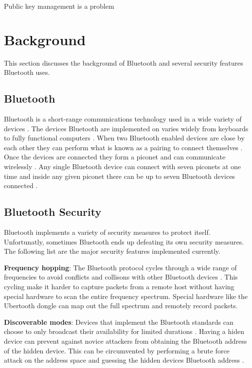 \documentclass{acm_proc_article-sp}
\begin{document}
Public key management is a problem \cite{almonanimitmssp}

\section{Background}
This section discusses the background of Bluetooth and several security features Bluetooth uses.

\subsection{Bluetooth}
Bluetooth is a short-range communications technology used in a wide variety of devices \cite{bluetooth}. The devices Bluetooth are implemented on varies widely from keyboards to fully functional computers \cite{bluetooth}. When two Bluetooth enabled devices are close by each other they can perform what is known as a pairing to connect themselves \cite{bluetooth}. Once the devices are connected they form a piconet and can communicate wirelessly \cite{bluetooth}. Any single Bluetooth device can connect with seven piconets at one time and inside any given piconet there can be up to seven Bluetooth devices connected \cite{bluetooth}. 

\subsection{Bluetooth Security}
Bluetooth implements a variety of security measures to protect itself. Unfortunatly, sometimes Bluetooth ends up defeating its own security measures. The following list are the major security features implemented currently.

\textbf{Frequency hopping}: The Bluetooth protocol cycles through a wide range of frequencies to avoid conflicts and collisons with other Bluetooth devices \cite{ma2007keystroke}. This cycling make it harder to capture packets from a remote host without having special hardware to scan the entire frequency spectrum. Special hardware like the Ubertooth dongle can map out the full spectrum and remotely record packets.

\textbf{Discoverable modes}: Devices that implement the Bluetooth standards can choose to only broadcast their availability for limited durations \cite{ma2007keystroke}. Having a hiden device can prevent against novice attackers from obtaining the Bluetooth address of the hidden device. This can be circumvented by performing a brute force attack on the address space and guessing the hidden devices Bluetooth address \cite{ma2007keystroke}.
\end{document}
